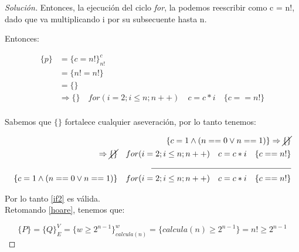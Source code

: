 \begin{proof}[Solución]
  Entonces, la ejecución del ciclo \textit{for}, la podemos reescribir
  como c = n!, dado que va multiplicando i por su subsecuente hasta n.

  Entonces:

  \begin{equation*}
    \begin{split}
      \{p\} &= \{c = n!\}^c_{n!}\\
      & = \{n! = n!\}\\
      & = \{\}\\
      & \Rightarrow \{\} \hspace{1em} for(i = 2; i \leq n;
    n++)\hspace{1em} c = c * i \hspace{1em} \{c == n!\}\\
    \end{split}
  \end{equation*}


    Sabemos que $\{\}$ fortalece cualquier aseveración, por lo tanto
  tenemos:

  \begin{equation*}
    \begin{split}
      \{c = 1 \land (n == 0 \lor n == 1)\} \Rightarrow \cancel{\{\}}\\
      \Rightarrow \cancel{\{\}}\hspace{1em} for(i = 2; i \leq n;
    n++)\hspace{1em} c = c * i \hspace{1em} \{c == n!\}\\
      \rule{6cm}{0.4pt}\\
      \{c = 1 \land (n == 0 \lor n == 1)\}\hspace{1em} for(i = 2; i \leq n;
      n++)\hspace{1em} c = c * i \hspace{1em} \{c == n!\}\\
    \end{split}
  \end{equation*}

  Por lo tanto \ref{if2} es válida.\\

  Retomando \ref{hoare}, tenemos que:

  \begin{equation}
    \{P\} = \{Q\}^V_E = \{w \ge 2^{n-1}\}^w_{calcula(n)} = \{calcula(n)
    \ge 2 ^{n - 1}\} = {n! \ge 2^{n - 1}}
  \end{equation}


\end{proof}
